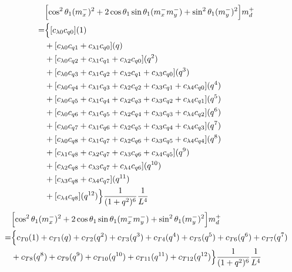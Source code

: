 \documentclass[12pt]{article}
\begin{document}
\begin{align}
    &\Bigl[\cos^2\theta_1(m_x^-)^2 + 2\cos\theta_1\sin\theta_1 (m_x^-m_y^-)  + \sin^2\theta_1(m_y^-)^2 \Bigr] m_d^+ \\
    =& \Bigl\{ [c_{\lambda0}c_{q0}](1)\nonumber\\
    &+ [c_{\lambda0}c_{q1} + c_{\lambda1}c_{q0}](q)\nonumber\\
    &+ [c_{\lambda0}c_{q2} + c_{\lambda1}c_{q1} + c_{\lambda2}c_{q0} ](q^2)\nonumber\\
    &+ [c_{\lambda0}c_{q3} + c_{\lambda1}c_{q2} +c_{\lambda2}c_{q1} +  c_{\lambda3}c_{q0}](q^3)\nonumber\\
    &+ [c_{\lambda0}c_{q4} + c_{\lambda1}c_{q3} + c_{\lambda2}c_{q2} + c_{\lambda3}c_{q1} + c_{\lambda4}c_{q0} ](q^4)\nonumber\\
    &+ [c_{\lambda0}c_{q5} + c_{\lambda1}c_{q4} +  c_{\lambda2}c_{q3} +  c_{\lambda3}c_{q2} +  c_{\lambda4}c_{q1}](q^5)\nonumber\\
    &+ [c_{\lambda0}c_{q6} + c_{\lambda1}c_{q5} + c_{\lambda2}c_{q4} + c_{\lambda3}c_{q3} + c_{\lambda4}c_{q2}](q^6)\nonumber\\
    &+ [c_{\lambda0}c_{q7} + c_{\lambda1}c_{q6} + c_{\lambda2}c_{q5} +  c_{\lambda3}c_{q4} + c_{\lambda4}c_{q3}](q^7)\nonumber\\
    &+ [c_{\lambda0}c_{q8} + c_{\lambda1}c_{q7} + c_{\lambda2}c_{q6} + c_{\lambda3}c_{q5} + c_{\lambda4}c_{q4}](q^8)\nonumber\\
    &+ [c_{\lambda1}c_{q8} +  c_{\lambda2}c_{q7} + c_{\lambda3}c_{q6} + c_{\lambda4}c_{q5}](q^9)\nonumber\\
    &+ [c_{\lambda2}c_{q8} + c_{\lambda3}c_{q7} + c_{\lambda4}c_{q6} ](q^{10})\nonumber\\
    &+ [c_{\lambda3}c_{q8} +  c_{\lambda4}c_{q7}](q^{11})\nonumber\\
    &+ [c_{\lambda4}c_{q8}](q^{12}) \Bigr\}\frac{1}{(1+q^2)^6}\frac{1}{L^4}
\end{align}
\begin{align}
    &\Bigl[\cos^2\theta_1(m_x^-)^2 + 2\cos\theta_1\sin\theta_1 (m_x^-m_y^-)  + \sin^2\theta_1(m_y^-)^2 \Bigr] m_d^+ \\
    =& \Bigl\{ c_{T0}(1) + c_{T1}(q) + c_{T2}(q^2) + c_{T3}(q^3) + c_{T4}(q^4) + c_{T5}(q^5) + c_{T6}(q^6) + c_{T7}(q^7)\nonumber\\
    &+ c_{T8}(q^8) + c_{T9}(q^9) + c_{T10}(q^{10}) + c_{T11}(q^{11}) + c_{T12}(q^{12}) \Bigr\}\frac{1}{(1+q^2)^6}\frac{1}{L^4}
\end{align}
\end{document}

